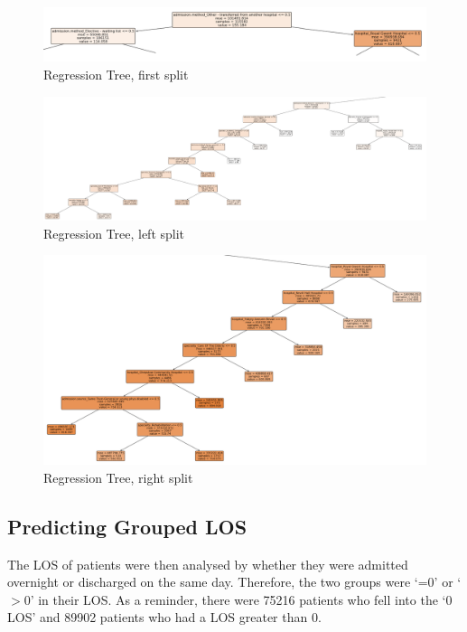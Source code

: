 \documentclass[../thesis.tex]{subfiles}
\begin{document}
\begin{landscape}
\begin{figure}
    \centering
    \includegraphics{Chapter4/Figures/Splitc.png}
    \caption{Regression Tree, first split}
    \label{fig:Cartsplit1}
\end{figure}

\begin{figure}
    \centering
    \includegraphics[width = 23cm]{Chapter4/Figures/Splita.png}
    \caption{Regression Tree, left split}
    \label{fig:Cartsplit2}
\end{figure}

\begin{figure}
    \centering
    \includegraphics[width=23cm]{Chapter4/Figures/Splitb.png}
    \caption{Regression Tree, right split}
    \label{fig:Cartsplit3}
\end{figure}
\end{landscape}


\subsection{Predicting Grouped LOS}
The LOS of patients were then analysed by whether they were admitted overnight or discharged on the same day. Therefore, the two groups were `=0' or `$>$0' in their LOS. As a reminder, there were 75216 patients who fell into the `0 LOS' and 89902 patients who had a LOS greater than 0.
\end{document}
